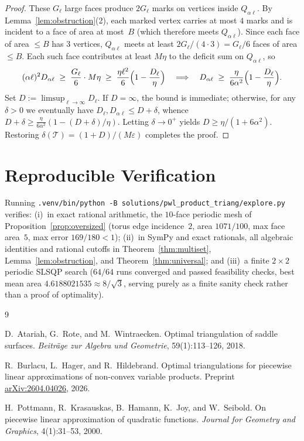 \documentclass[11pt]{article}
\theoremstyle{plain}
\theoremstyle{definition}
\theoremstyle{remark}
\begin{document}
\begin{proof}
These $G_\ell$ large faces produce $2G_\ell$ marks on vertices inside $Q_{\alpha\ell}$.
By Lemma~\ref{lem:obstruction}(2), each marked vertex carries at most $4$ marks and is incident to a face of area at most~$B$ (which therefore meets $Q_{\alpha\ell}$).
Since each face of area $\le B$ has $3$ vertices, $Q_{\alpha\ell}$ meets at least $2G_\ell / (4 \cdot 3) = G_\ell / 6$ faces of area $\le B$.
Each such face contributes at least $M\eta$ to the deficit sum on $Q_{\alpha\ell}$, so
\[
(\alpha\ell)^2 D_{\alpha\ell} \;\ge\; \frac{G_\ell}{6} \cdot M\eta
\;\ge\; \frac{\eta\ell^2}{6}\Bigl(1 - \frac{D_\ell}{\eta}\Bigr)
\quad\Longrightarrow\quad
D_{\alpha\ell} \;\ge\; \frac{\eta}{6\alpha^2}\Bigl(1 - \frac{D_\ell}{\eta}\Bigr).
\]
Set $D := \limsup_{\ell \to \infty} D_\ell$.
If $D = \infty$, the bound is immediate; otherwise, for any $\delta > 0$ we eventually have $D_\ell, D_{\alpha\ell} \le D + \delta$, whence $D + \delta \ge \frac{\eta}{6\alpha^2}(1 - (D+\delta)/\eta)$.
Letting $\delta \to 0^+$ yields $D \ge \eta / (1 + 6\alpha^2)$.
Restoring $\delta(\mathcal{T}) = (1 + D)/(M\varepsilon)$ completes the proof.
\end{proof}

\section{Reproducible Verification}

Running \texttt{.venv/bin/python -B solutions/pwl\_product\_triang/explore.py} verifies: (i)~in exact rational arithmetic, the $10$-face periodic mesh of Proposition~\ref{prop:oversized} (torus edge incidence~$2$, area $1071/100$, max face area~$5$, max error $169/180 < 1$); (ii)~in SymPy and exact rationals, all algebraic identities and rational cutoffs in Theorem~\ref{thm:multiset}, Lemma~\ref{lem:obstruction}, and Theorem~\ref{thm:universal}; and (iii)~a finite $2 \times 2$ periodic SLSQP search ($64/64$ runs converged and passed feasibility checks, best mean area $4.6188021535 \approx 8/\sqrt{3}$, serving purely as a finite sanity check rather than a proof of optimality).

\begin{thebibliography}{9}

D.~Atariah, G.~Rote, and M.~Wintraecken.
Optimal triangulation of saddle surfaces.
\emph{Beitr\"age zur Algebra und Geometrie}, 59(1):113--126, 2018.

R.~Burlacu, L.~Hager, and R.~Hildebrand.
Optimal triangulations for piecewise linear approximations of non-convex variable products.
Preprint \href{https://arxiv.org/abs/2604.04026}{arXiv:2604.04026}, 2026.

H.~Pottmann, R.~Krasauskas, B.~Hamann, K.~Joy, and W.~Seibold.
On piecewise linear approximation of quadratic functions.
\emph{Journal for Geometry and Graphics}, 4(1):31--53, 2000.

\end{thebibliography}
\end{document}
